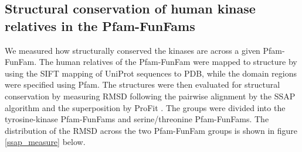 \documentclass[a4paper, 11pt]{article}
\begin{document}
\subsection*{Structural conservation of human kinase relatives in the Pfam-FunFams}
We measured how structurally conserved the kinases  are across a given Pfam-FunFam. The human relatives of the Pfam-FunFam were mapped to structure by using the SIFT mapping of  UniProt sequences to PDB, while the domain regions were specified using Pfam. The structures were then evaluated for structural conservation by measuring RMSD following the pairwise alignment by the SSAP algorithm \cite{orengo199636} and the superposition by ProFit \cite{MartinProFit2009}. The groups were divided into the tyrosine-kinase Pfam-FunFams and serine/threonine Pfam-FunFams. The distribution of the RMSD across the two Pfam-FunFam groups is shown in figure \ref{ssap_measure} below.
\end{document}
